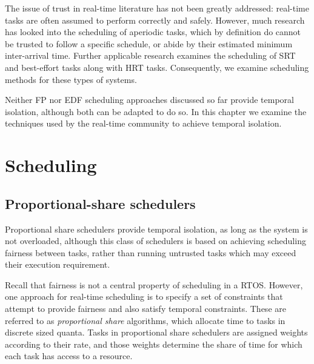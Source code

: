 The issue of trust in real-time literature has not been greatly addressed: real-time tasks are often
assumed to perform correctly and safely.  However, much research has looked into the scheduling of
aperiodic tasks, which by definition do cannot be trusted to follow a specific schedule, or abide by
their estimated minimum inter-arrival time. Further applicable research examines the scheduling of
\gls{SRT} and best-effort tasks along with \gls{HRT} tasks. Consequently, we examine scheduling methods for
these types of systems. 

Neither \gls{FP} nor \gls{EDF} scheduling
approaches discussed so far provide temporal isolation, although both can be adapted to do so.  In
this chapter we examine the techniques used by the real-time community to achieve temporal
isolation.


\section{Scheduling}


\subsection{Proportional-share schedulers}
\label{s:pfair}

Proportional share schedulers provide temporal isolation, as long as the system is not overloaded,
although this class of schedulers is based on achieving scheduling fairness between tasks, rather
than running untrusted tasks which may exceed their execution requirement. 

Recall that fairness is not a central property of scheduling in a \acrlong{RTOS}. However, one approach
for real-time scheduling is to specify a set of constraints that attempt to provide fairness and
also satisfy temporal constraints.  These are referred to as \emph{proportional share} algorithms,
which allocate time to tasks in discrete sized quanta. Tasks in proportional share schedulers are assigned 
weights according to their rate, and those weights determine the share of time for which each task 
has access to a resource.

